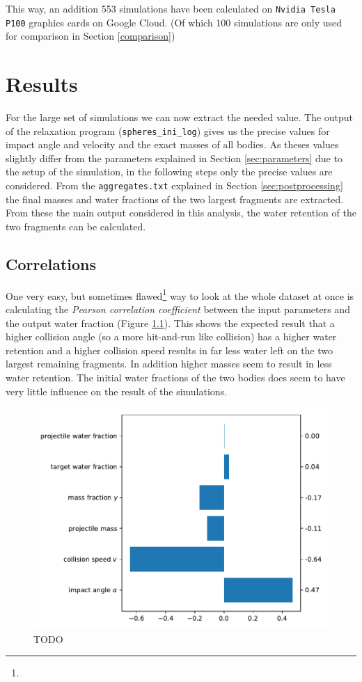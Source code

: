 This way, an addition \num{553} simulations have been calculated on \texttt{Nvidia Tesla P100} graphics cards on Google Cloud. (Of which 100 simulations are only used for comparison in Section \ref{comparison})

\chapter{Results}

For the large set of simulations we can now extract the needed value. The output of the relaxation program (\texttt{spheres\_ini\_log}) gives us the precise values for impact angle and velocity and the exact masses of all bodies. As theses values slightly differ from the parameters explained in Section \ref{sec:parameters} due to the setup of the simulation, in the following steps only the precise values are considered. From the \texttt{aggregates.txt} explained in Section \ref{sec:postprocessing} the final masses and water fractions of the two largest fragments are extracted. From these the main output considered in this analysis, the water retention of the two fragments can be calculated. 


\section{Correlations}
\label{sec:cov}
One very easy, but sometimes flawed\footnote{} way to look at the whole dataset at once is calculating the \textit{Pearson correlation coefficient} between the input parameters and the output water fraction (Figure \ref{fig:cov}). This shows the expected result that a higher collision angle (so a more hit-and-run like collision) has a higher water retention and a higher collision speed results in far less water left on the two largest remaining fragments. In addition higher masses seem to result in less water retention. The initial water fractions of the two bodies does seem to have very little influence on the result of the simulations.

\begin{figure}[h] %
	\centering
	\includegraphics[width=0.8\linewidth]{images/cov.pdf}
	\caption{TODO}
	\label{fig:cov}
\end{figure}

